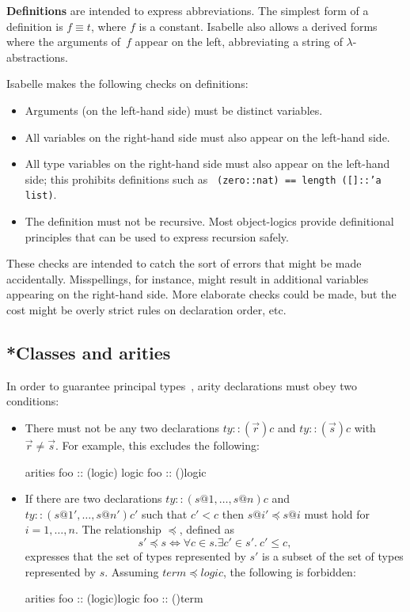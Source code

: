 {\bf Definitions} are intended to express abbreviations.  The simplest
form of a definition is $f \equiv t$, where $f$ is a constant.
Isabelle also allows a derived forms where the arguments of~$f$ appear
on the left, abbreviating a string of $\lambda$-abstractions.

Isabelle makes the following checks on definitions:
\begin{itemize}
\item Arguments (on the left-hand side) must be distinct variables.
\item All variables on the right-hand side must also appear on the left-hand
  side. 
\item All type variables on the right-hand side must also appear on
  the left-hand side; this prohibits definitions such as {\tt
    (zero::nat) == length ([]::'a list)}.
\item The definition must not be recursive.  Most object-logics provide
  definitional principles that can be used to express recursion safely.
\end{itemize}
These checks are intended to catch the sort of errors that might be made
accidentally.  Misspellings, for instance, might result in additional
variables appearing on the right-hand side.  More elaborate checks could be
made, but the cost might be overly strict rules on declaration order, etc.


\subsection{*Classes and arities}

In order to guarantee principal types~\cite{nipkow-prehofer},
arity declarations must obey two conditions:
\begin{itemize}
\item There must not be any two declarations $ty :: (\vec{r})c$ and
  $ty :: (\vec{s})c$ with $\vec{r} \neq \vec{s}$.  For example, this
  excludes the following:
\begin{ttbox}
arities
  foo :: ({\ttlbrace}logic{\ttrbrace}) logic
  foo :: ({\ttlbrace}{\ttrbrace})logic
\end{ttbox}

\item If there are two declarations $ty :: (s@1,\dots,s@n)c$ and $ty ::
  (s@1',\dots,s@n')c'$ such that $c' < c$ then $s@i' \preceq s@i$ must hold
  for $i=1,\dots,n$.  The relationship $\preceq$, defined as
\[ s' \preceq s \iff \forall c\in s. \exists c'\in s'.~ c'\le c, \]
expresses that the set of types represented by $s'$ is a subset of the
set of types represented by $s$.  Assuming $term \preceq logic$, the
following is forbidden:
\begin{ttbox}
arities
  foo :: ({\ttlbrace}logic{\ttrbrace})logic
  foo :: ({\ttlbrace}{\ttrbrace})term
\end{ttbox}

\end{itemize}


